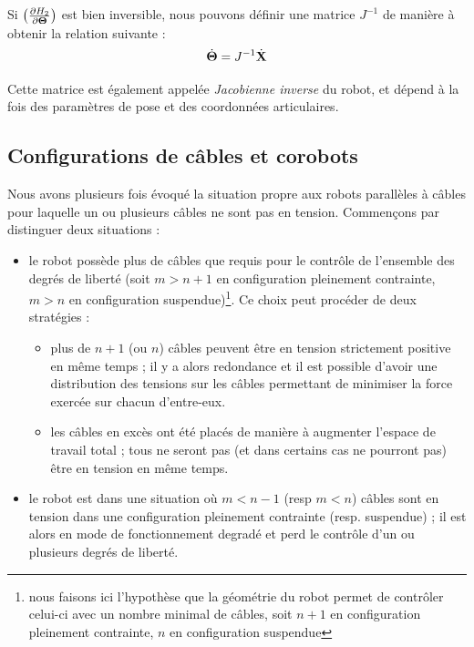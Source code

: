 Si $\left ( \frac{\partial H_2}{\partial {\bf \Theta}} \right )$ est bien inversible, nous pouvons définir une matrice $J^{-1}$ de manière à obtenir la relation suivante :
\begin{equation}
\dot {\bf \Theta} = J^{-1} \dot {\bf X}
\label{intro:eq11}
\end{equation}

Cette matrice est également appelée {\it Jacobienne inverse} du robot, et dépend à la fois des paramètres de pose et des coordonnées articulaires.


\subsection{Configurations de câbles et corobots}

Nous avons plusieurs fois évoqué la situation propre aux robots parallèles à câbles pour laquelle un ou plusieurs câbles ne sont pas en tension. Commençons par distinguer deux situations :
\begin{itemize}
 \item le robot possède plus de câbles que requis pour le contrôle de l'ensemble des degrés de liberté (soit $m > n+1$ en configuration pleinement contrainte, $m > n$ en configuration suspendue)\footnote{nous faisons ici l'hypothèse que la géométrie du robot permet de contrôler celui-ci avec un nombre minimal de câbles, soit $n+1$ en configuration pleinement contrainte, $n$ en configuration suspendue}. Ce choix peut procéder de deux stratégies :
 \begin{itemize}
  \item plus de $n+1$ (ou $n$) câbles peuvent être en tension strictement positive en même temps ; il y a alors redondance et il est possible d'avoir une distribution des tensions sur les câbles permettant de minimiser la force exercée sur chacun d'entre-eux.
  \item les câbles en excès ont été placés de manière à augmenter l'espace de travail total ; tous ne seront pas (et dans certains cas ne pourront pas) être en tension en même temps.
 \end{itemize}
 \item le robot est dans une situation où $m < n-1$ (resp $m < n$) câbles sont en tension dans une configuration pleinement contrainte (resp. suspendue) ; il est alors en mode de fonctionnement degradé et perd le contrôle d'un ou plusieurs degrés de liberté.
\end{itemize}

